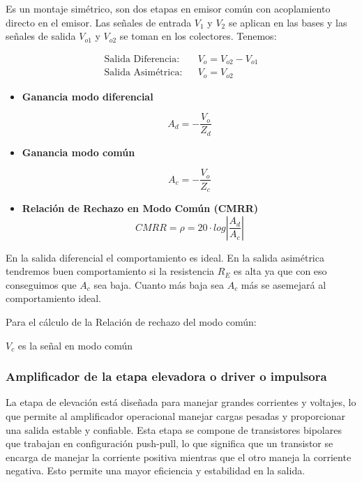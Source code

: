 Es un montaje simétrico, son dos etapas en emisor común con acoplamiento directo en el emisor.
Las señales de entrada $V_1$ y $V_2$ se aplican en las bases y las señales de salida $V_{o1}$ y $V_{o2}$ se toman en los colectores.
Tenemos:

\begin{align}
    \text{Salida Diferencia:} &  & V_o=V_{o2}-V_{o1} \\
    \text{Salida Asimétrica:} &  & V_o=V_{o2}
\end{align}

\begin{itemize}
    \item \textbf{Ganancia modo diferencial}

          \begin{equation}
              A_d=-\dfrac{V_o}{Z_d}
              \label{eqn:ad}
          \end{equation}


    \item \textbf{Ganancia modo común}

          \begin{equation}
              A_c=-\dfrac{V_o}{Z_c}
              \label{eqn:ac}
          \end{equation}


    \item \textbf{Relación de Rechazo en Modo Común (CMRR)}
          \begin{equation}
              CMRR=\rho=20\cdot log \left| \dfrac{A_d}{A_c}\right|
              \label{eqn:cmrr}
          \end{equation}
\end{itemize}


En la salida diferencial el comportamiento es ideal.
En la salida asimétrica tendremos buen comportamiento si la resistencia $R_E$ es alta ya que con eso conseguimos que $A_c$ sea baja. Cuanto más baja sea $A_c$
más se asemejará al comportamiento ideal.

Para el cálculo de la Relación de rechazo del modo común:

$V_c$ es la señal en modo común

\subsubsection{Amplificador de la etapa elevadora o driver o impulsora}

La etapa de elevación está diseñada para manejar grandes corrientes y voltajes, lo que permite al amplificador operacional manejar cargas pesadas y proporcionar una salida estable y confiable. Esta etapa se compone de transistores bipolares que trabajan en configuración push-pull, lo que significa que un transistor se encarga de manejar la corriente positiva mientras que el otro maneja la corriente negativa. Esto permite una mayor eficiencia y estabilidad en la salida.


